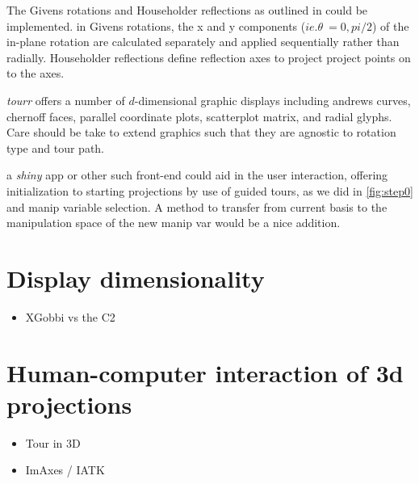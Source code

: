 \documentclass{monashthesis}
\begin{document}
The Givens rotations and Householder reflections as outlined in \textcite{buja_computational_2005} could be implemented. in Givens rotations, the x and y components (\(ie. \theta~= 0,pi/2\)) of the in-plane rotation are calculated separately and applied sequentially rather than radially. Householder reflections define reflection axes to project project points on to the axes.

\emph{tourr} offers a number of \(d\)-dimensional graphic displays including andrews curves, chernoff faces, parallel coordinate plots, scatterplot matrix, and radial glyphs. Care should be take to extend graphics such that they are agnostic to rotation type and tour path.

a \emph{shiny} app or other such front-end could aid in the user interaction, offering initialization to starting projections by use of guided tours, as we did in \ref{fig:step0} and manip variable selection. A method to transfer from current basis to the manipulation space of the new manip var would be a nice addition.

\hypertarget{ch:disp_dim}{%
\chapter{Display dimensionality}\label{ch:disp_dim}}

\begin{itemize}
\tightlist
\item
  XGobbi vs the C2
\end{itemize}

\hypertarget{ch:hci_3dproj}{%
\chapter{Human-computer interaction of 3d projections}\label{ch:hci_3dproj}}

\begin{itemize}
\tightlist
\item
  Tour in 3D
\item
  ImAxes / IATK
\end{itemize}

\printbibliography[heading=bibintoc]
\end{document}
